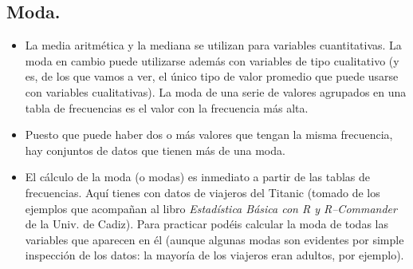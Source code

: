 \subsection{Moda.}

\begin{itemize}
    \item La media aritmética y la mediana se utilizan para variables cuantitativas. La moda en cambio puede utilizarse además con variables de tipo cualitativo (y es, de los que vamos a ver, el único tipo de valor promedio que puede usarse con variables cualitativas). {\sf La moda de una serie de valores agrupados en una tabla de frecuencias es el valor con la frecuencia más alta.}

    \item Puesto que puede haber dos o más valores que tengan la misma frecuencia, hay conjuntos de datos que tienen más de una moda.

    \item El cálculo de la moda (o modas) es inmediato a partir de las tablas de frecuencias. Aquí tienes  con datos de viajeros del Titanic (tomado de los ejemplos que acompañan al libro {\em Estadística Básica con R y R–Commander} de la Univ. de Cadiz). Para practicar podéis calcular la moda de todas las variables que aparecen en él (aunque algunas modas son evidentes por simple inspección de los datos: la mayoría de los viajeros eran adultos, por ejemplo).
\end{itemize}


%
%
%

